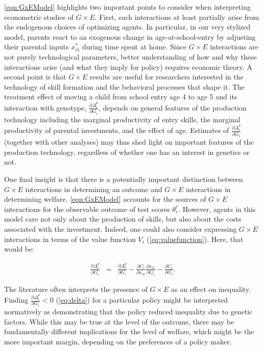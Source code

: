 \documentclass[12pt,a4paper]{article}
\begin{document}
\begin{bibunit}
\autoref{eqn:GxEModel} highlights two important points to consider when interpreting econometric studies of $G\times{}E$.  First, such interactions at least partially arise from the endogenous choices of optimizing agents.  In particular, in our very stylized model, parents react to an exogenous change in age-at-school-entry by adjusting their parental inputs $x_{i5}^{*}$ during time spent at home.  Since $G\times{}E$ interactions are not purely technological parameters, better understanding of how and why these interactions arise (and what they imply for policy) requires economic theory.
A second point is that $G\times{}E$ results are useful for researchers interested in the technology of skill formation and the behavioral processes that shape it.  The treatment effect of moving a child from school entry age 4 to age 5 and its interaction with genotype, $\frac{\partial \Delta_i^\theta}{\partial G_i}$, depends on general features of the production technology including the marginal productivity of entry skills, the marginal productivity of parental investments, and the effect of age.  Estimates of $\frac{\partial \Delta_i^\theta}{\partial G_i}$ (together with other analyses) may thus shed light on important features of the production technology, regardless of whether one has an interest in genetics or not.

One final insight is that there is a potentially important distinction between $G\times{}E$ interactions in determining an outcome and $G\times{}E$ interactions in determining welfare.  \autoref{eqn:GxEModel} accounts for the sources of  $G\times{}E$ interactions for the observable outcome of test scores $\theta_{i}^\tau$.  However, agents in this model care not only about the production of skills, but also about the costs associated with the investment.  Indeed, one could also consider expressing $G\times{}E$ interactions in terms of the value function $V_{i}$ (\autoref{eq:valuefunction}).  Here, that would be:

\begin{eqnarray}
\frac{\partial \Delta_i^V}{\partial G_i} & = & \frac{\partial \Delta_i^\theta}{\partial G_i}-\frac{\partial C_{i}}{\partial x_{i5}} \frac{\partial x_{i5}}{\partial G_i} - \frac{\partial C_{i}}{\partial G_i}.
\label{eqn:GxEModelWelfare}
\end{eqnarray}

The literature often interprets the presence of  $G\times{}E$ as an effect on inequality.  Finding  $\frac{\partial \Delta_i^\theta}{\partial G_i}<0$ (\autoref{eq:delta}) for a particular policy might be interpreted normatively as demonstrating that the policy reduced inequality due to genetic factors.  While this may be true at the level of the outcome, there may be fundamentally different implications for the level of welfare, which might be the more important margin, depending on the preferences of a policy maker.


\end{bibunit}
\end{document}
